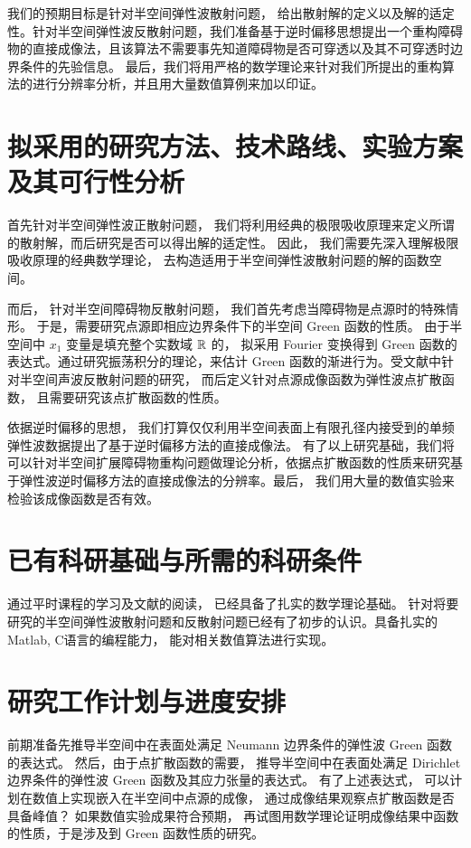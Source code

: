 我们的预期目标是针对半空间弹性波散射问题， 给出散射解的定义以及解的适定性。针对半空间弹性波反散射问题，我们准备基于逆时偏移思想提出一个重构障碍物的直接成像法，且该算法不需要事先知道障碍物是否可穿透以及其不可穿透时边界条件的先验信息。 最后，我们将用严格的数学理论来针对我们所提出的重构算法的进行分辨率分析，并且用大量数值算例来加以印证。

\section{拟采用的研究方法、技术路线、实验方案及其可行性分析}

首先针对半空间弹性波正散射问题， 我们将利用经典的极限吸收原理来定义所谓的散射解，而后研究是否可以得出解的适定性。 因此， 我们需要先深入理解极限吸收原理的经典数学理论， 去构造适用于半空间弹性波散射问题的解的函数空间。

而后， 针对半空间障碍物反散射问题， 我们首先考虑当障碍物是点源时的特殊情形。 于是，需要研究点源即相应边界条件下的半空间 Green 函数的性质。 由于半空间中 $x_1$ 变量是填充整个实数域 $\mathbb{R}$ 的， 拟采用 Fourier 变换得到 Green 函数的表达式。通过研究振荡积分的理论，来估计 Green 函数的渐进行为。受文献\cite{RTMhalf_aco}中针对半空间声波反散射问题的研究， 而后定义针对点源成像函数为弹性波点扩散函数， 且需要研究该点扩散函数的性质。

依据逆时偏移的思想， 我们打算仅仅利用半空间表面上有限孔径内接受到的单频弹性波数据提出了基于逆时偏移方法的直接成像法。 有了以上研究基础，我们将可以针对半空间扩展障碍物重构问题做理论分析，依据点扩散函数的性质来研究基于弹性波逆时偏移方法的直接成像法的分辨率。最后， 我们用大量的数值实验来检验该成像函数是否有效。
\section{已有科研基础与所需的科研条件}
通过平时课程的学习及文献的阅读， 已经具备了扎实的数学理论基础。 针对将要研究的半空间弹性波散射问题和反散射问题已经有了初步的认识。具备扎实的 Matlab, C语言的编程能力， 能对相关数值算法进行实现。


\section{研究工作计划与进度安排}

前期准备先推导半空间中在表面处满足 Neumann 边界条件的弹性波 Green 函数的表达式。 然后，由于点扩散函数的需要， 推导半空间中在表面处满足 Dirichlet 边界条件的弹性波 Green 函数及其应力张量的表达式。 有了上述表达式， 可以计划在数值上实现嵌入在半空间中点源的成像， 通过成像结果观察点扩散函数是否具备峰值？ 如果数值实验成果符合预期， 再试图用数学理论证明成像结果中函数的性质，于是涉及到 Green 函数性质的研究。

